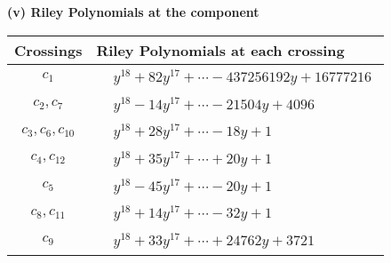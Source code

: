 \documentclass[1p]{elsarticle_modified}
\theoremstyle{definition}
\begin{document}
\newpage\renewcommand{\arraystretch}{1}
\flushleft \textbf{(v) Riley Polynomials at the component}\newline \\
\begin{tabular}{m{50pt}|m{274pt}}
Crossings & \hspace{64pt}Riley Polynomials at each crossing \\
\hline $$\begin{aligned}c_{1}\end{aligned}$$&$\begin{aligned}
&y^{18}+82 y^{17}+\cdots-437256192 y+16777216
\end{aligned}$\\
\hline $$\begin{aligned}c_{2},c_{7}\end{aligned}$$&$\begin{aligned}
&y^{18}-14 y^{17}+\cdots-21504 y+4096
\end{aligned}$\\
\hline $$\begin{aligned}c_{3},c_{6},c_{10}\end{aligned}$$&$\begin{aligned}
&y^{18}+28 y^{17}+\cdots-18 y+1
\end{aligned}$\\
\hline $$\begin{aligned}c_{4},c_{12}\end{aligned}$$&$\begin{aligned}
&y^{18}+35 y^{17}+\cdots+20 y+1
\end{aligned}$\\
\hline $$\begin{aligned}c_{5}\end{aligned}$$&$\begin{aligned}
&y^{18}-45 y^{17}+\cdots-20 y+1
\end{aligned}$\\
\hline $$\begin{aligned}c_{8},c_{11}\end{aligned}$$&$\begin{aligned}
&y^{18}+14 y^{17}+\cdots-32 y+1
\end{aligned}$\\
\hline $$\begin{aligned}c_{9}\end{aligned}$$&$\begin{aligned}
&y^{18}+33 y^{17}+\cdots+24762 y+3721
\end{aligned}$\\
\hline
\end{tabular}\\~\\
\end{document}
